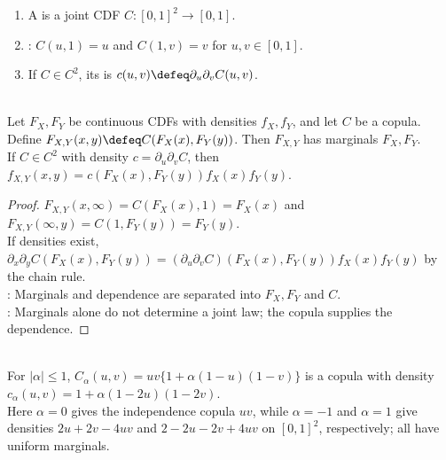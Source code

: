 \begin{definition} \label{def:copulas-and-copula-densities} 
\begin{enumerate}[label=(\roman*)]
\setlength{\itemsep}{0pt}
\item A  is a joint CDF $C:[0,1]^2\to[0,1]$.
\item {}: $C(u,1)=u$ and $C(1,v)=v$ for $u,v\in[0,1]$.
\item If $C\in C^2$, its  is $c(u,v)\defeq\partial_u\partial_vC(u,v)$.
\end{enumerate}
\end{definition}

\begin{proposition} \label{prop:copula-density-construction} \\
Let $F_X,F_Y$ be continuous CDFs with densities $f_X,f_Y$, and let $C$ be a copula.\\
Define $F_{X,Y}(x,y)\defeq C(F_X(x),F_Y(y))$. Then $F_{X,Y}$ has marginals $F_X,F_Y$.\\
If $C\in C^2$ with density $c=\partial_u\partial_vC$, then $f_{X,Y}(x,y)=c(F_X(x),F_Y(y))f_X(x)f_Y(y)$.
\begin{proof} $F_{X,Y}(x,\infty)=C(F_X(x),1)=F_X(x)$ and $F_{X,Y}(\infty,y)=C(1,F_Y(y))=F_Y(y)$.\\
If densities exist, $\partial_x\partial_y C(F_X(x),F_Y(y))=(\partial_u\partial_vC)(F_X(x),F_Y(y))f_X(x)f_Y(y)$ by the chain rule.\\
: Marginals and dependence are separated into $F_X,F_Y$ and $C$.\\
: Marginals alone do not determine a joint law; the copula supplies the dependence.
\end{proof}
\end{proposition}

\begin{example} \label{ex:farlie-morgenstern-copulas} \\
For $|\alpha|\leq1$, $C_\alpha(u,v)=uv\{1+\alpha(1-u)(1-v)\}$ is a copula with density $c_\alpha(u,v)=1+\alpha(1-2u)(1-2v)$.\\
Here $\alpha=0$ gives the independence copula $uv$, while $\alpha=-1$ and $\alpha=1$ give densities $2u+2v-4uv$ and $2-2u-2v+4uv$ on $[0,1]^2$, respectively; all have uniform marginals.
\end{example}
